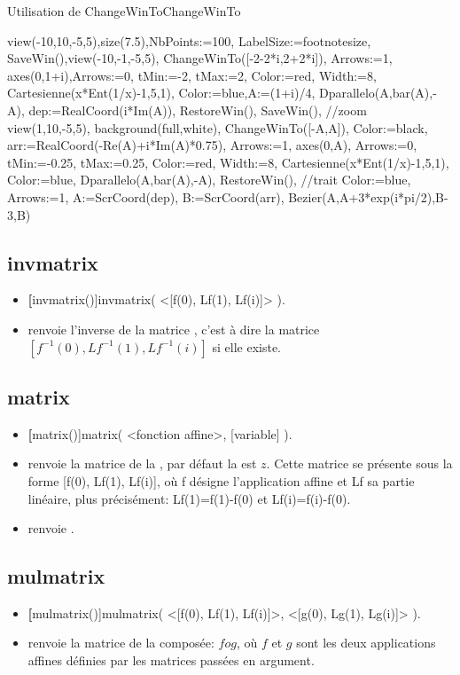 \begin{demo}{Utilisation de ChangeWinTo}{ChangeWinTo}
\begin{texgraph}[name=ChangeWinTo]
view(-10,10,-5,5),size(7.5),NbPoints:=100,
LabelSize:=footnotesize, SaveWin(),view(-10,-1,-5,5),
ChangeWinTo([-2-2*i,2+2*i]),
Arrows:=1, axes(0,1+i),Arrows:=0,
tMin:=-2, tMax:=2, Color:=red, Width:=8,
Cartesienne(x*Ent(1/x)-1,5,1),
Color:=blue,A:=(1+i)/4, Dparallelo(A,bar(A),-A),
dep:=RealCoord(i*Im(A)), RestoreWin(), SaveWin(),
//zoom
view(1,10,-5,5), background(full,white),
ChangeWinTo([-A,A]), Color:=black,
arr:=RealCoord(-Re(A)+i*Im(A)*0.75),
Arrows:=1, axes(0,A), Arrows:=0,
tMin:=-0.25, tMax:=0.25, Color:=red, Width:=8,
Cartesienne(x*Ent(1/x)-1,5,1),
Color:=blue, Dparallelo(A,bar(A),-A),
RestoreWin(),
//trait
Color:=blue, Arrows:=1,
A:=ScrCoord(dep), B:=ScrCoord(arr),
Bezier(A,A+3*exp(i*pi/2),B-3,B) 
\end{texgraph}
\end{demo}


\subsection{invmatrix}
\begin{itemize}
 \item \util \textbf[invmatrix()]{invmatrix( <[f(0), Lf(1), Lf(i)]> )}.
 \item \desc renvoie l'inverse de la matrice \argu{[f(0), Lf(1), Lf(i)]}, c'est à dire la matrice $[f^{-1}(0), Lf^{-1}(1), Lf^{-1}(i)]$ si elle existe.
\end{itemize}

\subsection{matrix}
\begin{itemize}
 \item \util \textbf[matrix()]{matrix( <fonction affine>, [variable] )}.
 \item \desc renvoie la matrice de la , par défaut la  est $z$. Cette matrice se présente sous la forme [f(0), Lf(1), Lf(i)], où f désigne l'application affine et Lf sa partie linéaire, plus précisément: Lf(1)=f(1)-f(0) et Lf(i)=f(i)-f(0). 
 \item \exem {} renvoie \res{[0,i,1]}.
\end{itemize}


\subsection{mulmatrix}
\begin{itemize}
 \item \util \textbf[mulmatrix()]{mulmatrix( <[f(0), Lf(1), Lf(i)]>, <[g(0), Lg(1), Lg(i)]> )}.
 \item \desc renvoie la matrice de la composée: $fog$, où $f$ et $g$ sont les deux applications affines définies par les matrices passées en argument.
\end{itemize}

